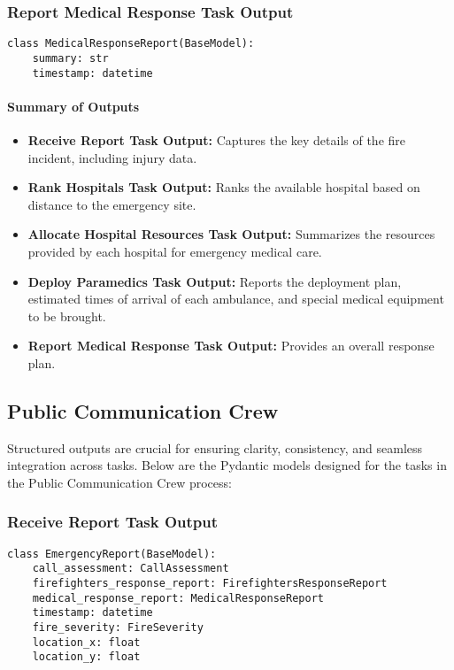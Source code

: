 \subsubsection{Report Medical Response Task Output}
\begin{lstlisting}[caption={Pydantic model for Report Medical Response Task Output}]
class MedicalResponseReport(BaseModel):
    summary: str
    timestamp: datetime
\end{lstlisting}

\paragraph{Summary of Outputs}
\begin{itemize}
    \item \textbf{Receive Report Task Output:} Captures the key details of the fire incident, including injury data.
    \item \textbf{Rank Hospitals Task Output:} Ranks the available hospital based on distance to the emergency site.
    \item \textbf{Allocate Hospital Resources Task Output:} Summarizes the resources provided by each hospital for emergency medical care.
    \item \textbf{Deploy Paramedics Task Output:} Reports the deployment plan, estimated times of arrival of each ambulance, and special medical equipment to be brought.
    \item \textbf{Report Medical Response Task Output:} Provides an overall response plan.
\end{itemize}

\subsection{Public Communication Crew}

Structured outputs are crucial for ensuring clarity, consistency, and seamless integration across tasks. Below are the Pydantic models designed for the tasks in the Public Communication Crew process:

\subsubsection{Receive Report Task Output}
\begin{lstlisting}[caption={Pydantic model for Receive Report Task Output}]
class EmergencyReport(BaseModel):
    call_assessment: CallAssessment
    firefighters_response_report: FirefightersResponseReport
    medical_response_report: MedicalResponseReport
    timestamp: datetime
    fire_severity: FireSeverity
    location_x: float
    location_y: float
\end{lstlisting}

